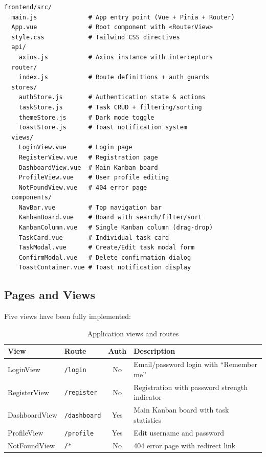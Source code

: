 \documentclass[12pt, a4paper]{article}
\begin{document}
\begin{lstlisting}
frontend/src/
  main.js              # App entry point (Vue + Pinia + Router)
  App.vue              # Root component with <RouterView>
  style.css            # Tailwind CSS directives
  api/
    axios.js           # Axios instance with interceptors
  router/
    index.js           # Route definitions + auth guards
  stores/
    authStore.js       # Authentication state & actions
    taskStore.js       # Task CRUD + filtering/sorting
    themeStore.js      # Dark mode toggle
    toastStore.js      # Toast notification system
  views/
    LoginView.vue      # Login page
    RegisterView.vue   # Registration page
    DashboardView.vue  # Main Kanban board
    ProfileView.vue    # User profile editing
    NotFoundView.vue   # 404 error page
  components/
    NavBar.vue         # Top navigation bar
    KanbanBoard.vue    # Board with search/filter/sort
    KanbanColumn.vue   # Single Kanban column (drag-drop)
    TaskCard.vue       # Individual task card
    TaskModal.vue      # Create/Edit task modal form
    ConfirmModal.vue   # Delete confirmation dialog
    ToastContainer.vue # Toast notification display
\end{lstlisting}

\subsection{Pages and Views}

Five views have been fully implemented:

\begin{table}[H]
\centering
\begin{tabularx}{\textwidth}{llcX}
\toprule
\textbf{View} & \textbf{Route} & \textbf{Auth} & \textbf{Description} \\
\midrule
LoginView     & \texttt{/login}     & No  & Email/password login with ``Remember me'' \\
RegisterView  & \texttt{/register}  & No  & Registration with password strength indicator \\
DashboardView & \texttt{/dashboard} & Yes & Main Kanban board with task statistics \\
ProfileView   & \texttt{/profile}   & Yes & Edit username and password \\
NotFoundView  & \texttt{/*}         & No  & 404 error page with redirect link \\
\bottomrule
\end{tabularx}
\caption{Application views and routes}
\end{table}
\end{document}
